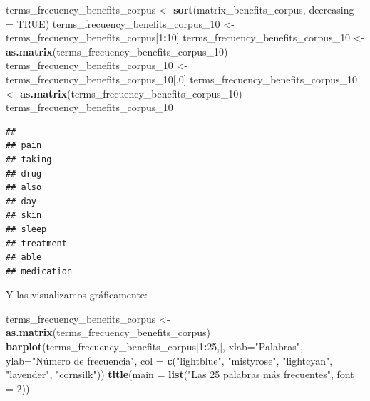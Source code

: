 \documentclass[spanish,]{article}
\newenvironment{Shaded}{\begin{snugshade}}{\end{snugshade}}
\newcommand{\KeywordTok}[1]{\textcolor[rgb]{0.13,0.29,0.53}{\textbf{#1}}}
\newcommand{\DataTypeTok}[1]{\textcolor[rgb]{0.13,0.29,0.53}{#1}}
\newcommand{\DecValTok}[1]{\textcolor[rgb]{0.00,0.00,0.81}{#1}}
\newcommand{\StringTok}[1]{\textcolor[rgb]{0.31,0.60,0.02}{#1}}
\newcommand{\OtherTok}[1]{\textcolor[rgb]{0.56,0.35,0.01}{#1}}
\newcommand{\OperatorTok}[1]{\textcolor[rgb]{0.81,0.36,0.00}{\textbf{#1}}}
\newcommand{\NormalTok}[1]{#1}
\begin{document}
\begin{Shaded}
\begin{Highlighting}[]
\NormalTok{terms_frecuency_benefits_corpus <-}\StringTok{ }\KeywordTok{sort}\NormalTok{(matrix_benefits_corpus, }\DataTypeTok{decreasing =} \OtherTok{TRUE}\NormalTok{)}
\NormalTok{terms_frecuency_benefits_corpus_}\DecValTok{10}\NormalTok{ <-}\StringTok{ }\NormalTok{terms_frecuency_benefits_corpus[}\DecValTok{1}\OperatorTok{:}\DecValTok{10}\NormalTok{]}
\NormalTok{terms_frecuency_benefits_corpus_}\DecValTok{10}\NormalTok{ <-}\StringTok{ }\KeywordTok{as.matrix}\NormalTok{(terms_frecuency_benefits_corpus_}\DecValTok{10}\NormalTok{)}
\NormalTok{terms_frecuency_benefits_corpus_}\DecValTok{10}\NormalTok{ <-}\StringTok{ }\NormalTok{terms_frecuency_benefits_corpus_}\DecValTok{10}\NormalTok{[,}\DecValTok{0}\NormalTok{]}
\NormalTok{terms_frecuency_benefits_corpus_}\DecValTok{10}\NormalTok{ <-}\StringTok{ }\KeywordTok{as.matrix}\NormalTok{(terms_frecuency_benefits_corpus_}\DecValTok{10}\NormalTok{)}
\NormalTok{terms_frecuency_benefits_corpus_}\DecValTok{10}
\end{Highlighting}
\end{Shaded}

\begin{verbatim}
##           
## pain      
## taking    
## drug      
## also      
## day       
## skin      
## sleep     
## treatment 
## able      
## medication
\end{verbatim}

Y las visualizamos gráficamente:

\begin{Shaded}
\begin{Highlighting}[]
\NormalTok{terms_frecuency_benefits_corpus <-}\StringTok{ }\KeywordTok{as.matrix}\NormalTok{(terms_frecuency_benefits_corpus)}
\KeywordTok{barplot}\NormalTok{(terms_frecuency_benefits_corpus[}\DecValTok{1}\OperatorTok{:}\DecValTok{25}\NormalTok{,],  }\DataTypeTok{xlab=}\StringTok{"Palabras"}\NormalTok{, }\DataTypeTok{ylab=}\StringTok{"Número de frecuencia"}\NormalTok{,}
        \DataTypeTok{col =} \KeywordTok{c}\NormalTok{(}\StringTok{"lightblue"}\NormalTok{, }\StringTok{"mistyrose"}\NormalTok{, }\StringTok{"lightcyan"}\NormalTok{,}
                \StringTok{"lavender"}\NormalTok{, }\StringTok{"cornsilk"}\NormalTok{))}
\KeywordTok{title}\NormalTok{(}\DataTypeTok{main =} \KeywordTok{list}\NormalTok{(}\StringTok{"Las 25 palabras más frecuentes"}\NormalTok{, }\DataTypeTok{font =} \DecValTok{2}\NormalTok{))}
\end{Highlighting}
\end{Shaded}
\end{document}
